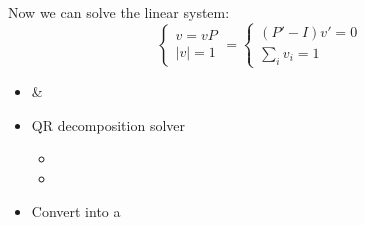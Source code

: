\begin{frame}
  Now we can \alert{solve} the linear system:
  \begin{equation*}
    \begin{cases}
      v=vP\\
      |v| = 1
    \end{cases}
    =
    \begin{cases}
      (P'-I)v'=0\\
      \sum_i v_i = 1
    \end{cases}
  \end{equation*}
  \begin{itemize}
  \item {} \& 
  \item \alert{QR decomposition} solver
    \begin{itemize}\tiny
    \item {}
    \item {}
    \end{itemize}
  \item \alert{Convert}  into a 
  \end{itemize}
\end{frame}

